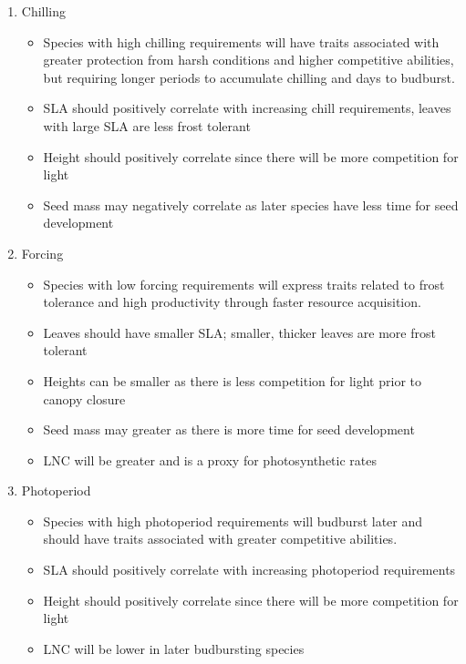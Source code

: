 \documentclass{article}\usepackage[]{graphicx}\usepackage[]{color}
\begin{document}
\begin{enumerate}
\item Chilling
\begin{itemize}
\item Species with high chilling requirements will have traits associated with greater protection from harsh conditions and higher competitive abilities, but requiring longer periods to accumulate chilling and days to budburst.
\item SLA should positively correlate with increasing chill requirements, leaves with large SLA are less frost tolerant 
\item Height should positively correlate since there will be more competition for light
\item Seed mass may negatively correlate as later species have less time for seed development 
\end{itemize}

\item Forcing
\begin{itemize}
\item Species with low forcing requirements will express traits related to frost tolerance and high productivity through faster resource acquisition.
\item Leaves should have smaller SLA; smaller, thicker leaves are more frost tolerant
\item Heights can be smaller as there is less competition for light prior to canopy closure
\item Seed mass may greater as there is more time for seed development 
\item LNC will be greater and is a proxy for photosynthetic rates
\end{itemize}

\item Photoperiod
\begin{itemize}
\item Species with high photoperiod requirements will budburst later and should have traits associated with greater competitive abilities.
\item SLA should positively correlate with increasing photoperiod requirements 
\item Height should positively correlate since there will be more competition for light
\item LNC will be lower in later budbursting species  
\end{itemize}

\end{enumerate}
\end{document}
